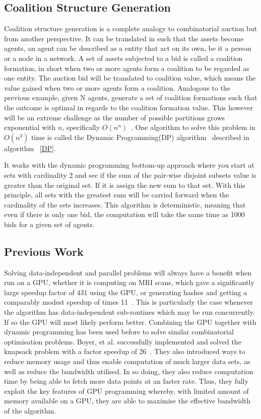 \documentclass[a4paper, 12pt]{report}
\begin{document}
\subsection{Coalition Structure Generation}
Coalition structure generation is a complete analogy to combinatorial auction
but from another perspective.
It can be translated in such that the assets become agents, 
an agent can be described as a entity that act on its own, be it a person or a
node in a network.
A set of assets subjected to a bid is called a coalition formation, 
in short when two or more agents form a coalition to be regarded as one entity.
The auction bid will be translated to coalition value, 
which means the value gained when two or more agents form a coalition.
Analogous to the previous example, given N agents, 
generate a set of coalition formations such that the outcome is optimal in
regards to the coalition formation value.
This however will be an extreme challenge as the number of possible partitions
grows exponential with $n$, specifically $O(n^n)$~\cite{eps265062}.
One algorithm to solve this problem in $O(n^3)$ time is called the Dynamic
Programming(DP) algorithm~\cite{DPalgorithm} described in
algorithm ~\ref{DP}.

It works with the dynamic programming bottom-up approach where you start at sets
with cardinality 2 and see if the sum of the pair-wise disjoint subsets value is
greater than the original set.
If it is assign the new sum to that set.
With this principle, 
all sets with the greatest sum will be carried forward when the cardinality of
the sets increases.
This algorithm is deterministic, 
meaning that even if there is only one bid, the computation will take the same
time as 1000 bids for a given set of agents. \\

\subsection{Previous Work}
Solving data-independent and parallel problems will always have a benefit when
run on a GPU, 
whether it is computing on MRI scans, which gave a significantly large speedup
factor of 431 using the GPU, 
or generating hashes and getting a comparably modest speedup of times
11~\cite{ryoo2008optimization}.  
This is particularly the case whenever the algorithm has data-independent
sub-routines which may be run concurrently. 
If so the GPU will most likely perform better. 
Combining the GPU together with dynamic programming has been used before to
solve similar combinatorial optimisation problems.  
Boyer, et al. successfully implemented and solved the knapsack problem with a
factor speedup of 26~\cite{boyer2012solving}.  
They also introduced ways to reduce memory usage and thus enable computation of
much larger data sets, as well as reduce the  bandwidth utilised. 
In so doing, they also reduce computation time by being able to fetch more data
points at an faster rate. 
Thus, they fully exploit the key features of GPU programming whereby, with
limited amount of memory available on a GPU,  
they are able to maximise the effective bandwidth of the algorithm.
\end{document}
